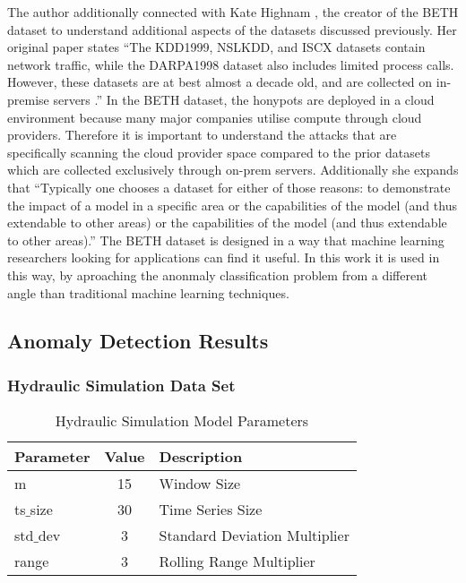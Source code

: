 The author additionally connected with Kate Highnam \cite{Highnam-email:private}, the creator of the BETH dataset to understand additional aspects of the datasets discussed previously. Her original paper states ``The KDD1999, NSLKDD, and ISCX datasets contain network traffic, while the DARPA1998 dataset also includes limited process calls. However, these datasets are at best almost a decade old, and are collected on in-premise servers \cite{beth-dataset}.'' In the BETH dataset, the honypots are deployed in a cloud environment because many major companies utilise compute through cloud providers. Therefore it is important to understand the attacks that are specifically scanning the cloud provider space compared to the prior datasets which are collected exclusively through on-prem servers. Additionally she expands that ``Typically one chooses a dataset for either of those reasons: to demonstrate the impact of a model in a specific area or the capabilities of the model (and thus extendable to other areas)  or the capabilities of the model (and thus extendable to other areas).'' The BETH dataset is designed in a way that machine learning researchers looking for applications can find it useful. In this work it is used in this way, by aproaching the anonmaly classification problem from a different angle than traditional machine learning techniques.

\subsection{Anomaly Detection Results}

\subsubsection{Hydraulic Simulation Data Set}

\begin{table}[H]
\centering
\begin{tabular}{|l|c|l|}
    \hline
	\textbf{Parameter} & \textbf{Value} & \textbf{Description} \\ \hline
	m & 15 & Window Size \\ \hline
	ts$\_$size & 30 & Time Series Size \\ \hline
	std$\_$dev & 3 & Standard Deviation Multiplier \\ \hline
	range & 3 & Rolling Range Multiplier\\ \hline
\end{tabular}%
\caption{Hydraulic Simulation Model Parameters}
\label{tab:hydraulic_sim_params}
\end{table}

